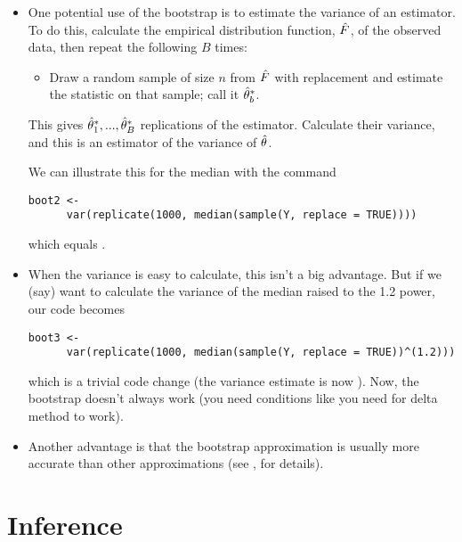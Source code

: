 \begin{itemize}

\item One potential use of the bootstrap is to estimate the variance
  of an estimator.  To do this, calculate the empirical distribution
  function, $\hat{F}$, of the observed data, then repeat the following $B$
  times:
  \begin{itemize}
  \item Draw a random sample of size $n$ from $\hat{F}$ with replacement
    and estimate the statistic on that sample; call it $\hat{\theta}^*_b$.
  \end{itemize}
  This gives $\hat{\theta}^*_1,...,\hat{\theta}^*_B$ replications of the estimator.
  Calculate their variance, and this is an estimator of the variance
  of $\hat{\theta}$.

  We can illustrate this for the median with the command
  \begin{lstlisting}[firstline=2,gobble=6]
    boot2 <-
      var(replicate(1000, median(sample(Y, replace = TRUE))))
  \end{lstlisting}
  which equals \medv.

\item When the variance is easy to calculate, this isn't a big
  advantage.  But if we (say) want to calculate the variance of the
  median raised to the 1.2 power, our code becomes
  \begin{lstlisting}[firstline=2,gobble=6]
    boot3 <-
      var(replicate(1000, median(sample(Y, replace = TRUE))^(1.2)))
  \end{lstlisting}
  which is a trivial code change (the variance estimate is now \powv).
  Now, the bootstrap doesn't always work (you need conditions like you
  need for delta method to work).

\item Another advantage is that the bootstrap approximation is usually
  more accurate than other approximations (see \citealp{Hal91}, for
  details).

\end{itemize}

\section{Inference}

